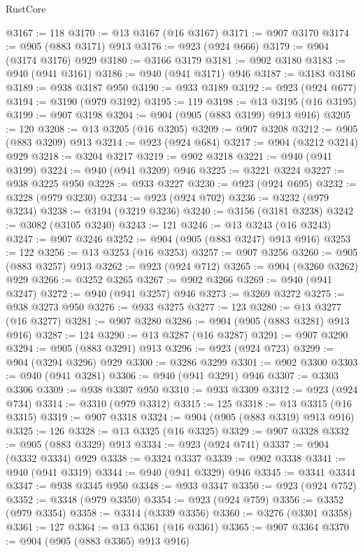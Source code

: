 \begin{lexlean}{RustCore}
\begin{coremodule}
@3167 := 118
@3170 := @13 @3167 (@16 @3167)
@3171 := @907 @3170
@3174 := @905 (@883 @3171) @913
@3176 := @923 (@924 @666)
@3179 := @904 (@3174 @3176) @929
@3180 := @3166 @3179
@3181 := @902 @3180
@3183 := @940 (@941 @3161)
@3186 := @940 (@941 @3171) @946
@3187 := @3183 @3186
@3189 := @938 @3187 @950
@3190 := @933 @3189
@3192 := @923 (@924 @677)
@3194 := @3190 (@979 @3192)
@3195 := 119
@3198 := @13 @3195 (@16 @3195)
@3199 := @907 @3198
@3204 := @904 (@905 (@883 @3199) @913 @916)
@3205 := 120
@3208 := @13 @3205 (@16 @3205)
@3209 := @907 @3208
@3212 := @905 (@883 @3209) @913
@3214 := @923 (@924 @684)
@3217 := @904 (@3212 @3214) @929
@3218 := @3204 @3217
@3219 := @902 @3218
@3221 := @940 (@941 @3199)
@3224 := @940 (@941 @3209) @946
@3225 := @3221 @3224
@3227 := @938 @3225 @950
@3228 := @933 @3227
@3230 := @923 (@924 @695)
@3232 := @3228 (@979 @3230)
@3234 := @923 (@924 @702)
@3236 := @3232 (@979 @3234)
@3238 := @3194 (@3219 @3236)
@3240 := @3156 (@3181 @3238)
@3242 := @3082 (@3105 @3240)
@3243 := 121
@3246 := @13 @3243 (@16 @3243)
@3247 := @907 @3246
@3252 := @904 (@905 (@883 @3247) @913 @916)
@3253 := 122
@3256 := @13 @3253 (@16 @3253)
@3257 := @907 @3256
@3260 := @905 (@883 @3257) @913
@3262 := @923 (@924 @712)
@3265 := @904 (@3260 @3262) @929
@3266 := @3252 @3265
@3267 := @902 @3266
@3269 := @940 (@941 @3247)
@3272 := @940 (@941 @3257) @946
@3273 := @3269 @3272
@3275 := @938 @3273 @950
@3276 := @933 @3275
@3277 := 123
@3280 := @13 @3277 (@16 @3277)
@3281 := @907 @3280
@3286 := @904 (@905 (@883 @3281) @913 @916)
@3287 := 124
@3290 := @13 @3287 (@16 @3287)
@3291 := @907 @3290
@3294 := @905 (@883 @3291) @913
@3296 := @923 (@924 @723)
@3299 := @904 (@3294 @3296) @929
@3300 := @3286 @3299
@3301 := @902 @3300
@3303 := @940 (@941 @3281)
@3306 := @940 (@941 @3291) @946
@3307 := @3303 @3306
@3309 := @938 @3307 @950
@3310 := @933 @3309
@3312 := @923 (@924 @734)
@3314 := @3310 (@979 @3312)
@3315 := 125
@3318 := @13 @3315 (@16 @3315)
@3319 := @907 @3318
@3324 := @904 (@905 (@883 @3319) @913 @916)
@3325 := 126
@3328 := @13 @3325 (@16 @3325)
@3329 := @907 @3328
@3332 := @905 (@883 @3329) @913
@3334 := @923 (@924 @741)
@3337 := @904 (@3332 @3334) @929
@3338 := @3324 @3337
@3339 := @902 @3338
@3341 := @940 (@941 @3319)
@3344 := @940 (@941 @3329) @946
@3345 := @3341 @3344
@3347 := @938 @3345 @950
@3348 := @933 @3347
@3350 := @923 (@924 @752)
@3352 := @3348 (@979 @3350)
@3354 := @923 (@924 @759)
@3356 := @3352 (@979 @3354)
@3358 := @3314 (@3339 @3356)
@3360 := @3276 (@3301 @3358)
@3361 := 127
@3364 := @13 @3361 (@16 @3361)
@3365 := @907 @3364
@3370 := @904 (@905 (@883 @3365) @913 @916)

\end{coremodule}
\end{lexlean}
